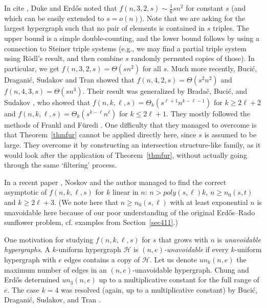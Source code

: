 \documentclass[graybox]{svmult}
\renewcommand{\le}{\leqslant}
\renewcommand{\ge}{\geqslant}
\newcommand{\m}{\mathcal}
\begin{document}
In cite \cite{DE}, Duke and Erd\H os noted that $f(n,3,2,s) \sim \frac 16 s n^2$ for constant $s$ (and which can be easily extended to $s=o(n)$). Note that we are asking for the largest hypergraph such that no pair of elements is contained in $s$ triples. The upper bound is a simple double-counting, and the lower bound follows by using a connection to Steiner triple systems (e.g., we may find a partial triple system using R\"odl's result, and then combine $s$ randomly permuted copies of those). In particular, we get $f(n,3,2,s) = \Theta (sn^2)$ for all $s$. Much more recently, Buci\'c, Dragani\'c, Sudakov and Tran \cite{BDST} showed that $f(n,4,2,s) = \Theta (s^2n^2)$ and $f(n,4, 3,s) =\Theta(s n^3)$. Their result was generalized by Brada\v c, Buci\'c, and Sudakov \cite{BBS}, who showed that $f(n,k,\ell,s) = \Theta_k(s^{\ell+1}n^{k-\ell-1})$ for $k\ge 2\ell+2$ and $f(n,k,\ell,s) = \Theta_k(s^{k-\ell}n^{\ell})$ for $k\le 2\ell+1$. They mostly followed the methods of Frankl and F\"uredi \cite{FF1}. One difficulty that they managed to overcome is that Theorem~\ref{thmfur} cannot be applied directly here, since $s$ is assumed to be large. They overcome it by constructing an intersection structure-like family, as it would look after the application of Theorem~\ref{thmfur}, without actually going through the same `filtering' process.

In a recent paper \cite{KN}, Noskov and the author managed to find the correct asymptotic of $f(n,k,\ell,s)$ for $k$ linear in $n$:  $n>poly(s,\ell) k$, $n\ge n_0(s,t)$ and $k\ge 2\ell+3$. (We note here that $n\ge n_0(s,\ell)$ with at least exponential $n$ is unavoidable here because of our poor understanding of the original Erd\H os--Rado sunflower problem, cf. examples from Section~\ref{sec411}.)

One motivation for studying $f(n,k,\ell,s)$ for $s$ that grows with $n$ is {\it unavoidable hypergraphs}. A $k$-uniform hypergraph $\m H$ is {\it $(n,e)$-unavoidable} if every $k$-uniform hypergraph with $e$ edges contains a copy of $\m H$. Let us denote $un_k(n,e)$ the maximum number of edges in an $(n,e)$-unavoidable hypergraph. Chung and Erd\H os \cite{CE} determined $un_3(n,e)$ up to a multiplicative constant for the full range of $e$. The case $k=4$ was resolved (again, up to a multiplicative constant) by Buci\'c, Dragani\'c, Sudakov, and Tran \cite{BDST}.
\end{document}
